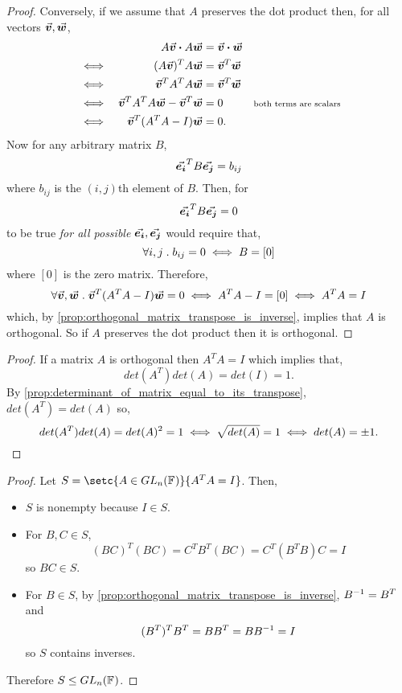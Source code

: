 \documentclass[../MathsNotesBase.tex]{subfiles}
\begin{document}
{\begin{proof}
			Conversely, if we assume that $A$ preserves the dot product then, for all vectors ${ \vec{\bm{v}},\vec{\bm{w}} }$,
			\begin{align*}
			&& A\vec{\bm{v}} \boldsymbol{\cdot} A\vec{\bm{w}} &= \vec{\bm{v}} \boldsymbol{\cdot} \vec{\bm{w}}  \\
			&\iff & (A\vec{\bm{v}})^TA\vec{\bm{w}} &= \vec{\bm{v}}^T\vec{\bm{w}} & \\
			&\iff & \vec{\bm{v}}^TA^TA\vec{\bm{w}} &= \vec{\bm{v}}^T\vec{\bm{w}} & \\
			&\iff & \vec{\bm{v}}^TA^TA\vec{\bm{w}} - \vec{\bm{v}}^T\vec{\bm{w}} &= 0 & \text{\scriptsize{both terms are scalars}}\\
			&\iff & \vec{\bm{v}}^T(A^TA - I)\vec{\bm{w}} &= 0. &
			\end{align*}
			Now for any arbitrary matrix $B$, 
			\[ \vec{\bm{e_i}}^T B \vec{\bm{e_j}} = b_{ij} \]
			where $b_{ij}$ is the $(i,j)$th element of $B$. Then, for
			\[ \vec{\bm{e_i}}^T B \vec{\bm{e_j}} = 0 \]
			to be true \textit{for all possible} ${ \vec{\bm{e_i}},\vec{\bm{e_j}} }$ would require that, 
			\[ \forall i,j \;.\; b_{ij} = 0 \iff B = [0] \]
			where $[0]$ is the zero matrix. Therefore,
			\[ \forall \vec{\bm{v}},\vec{\bm{w}} \;.\; \vec{\bm{v}}^T(A^TA - I)\vec{\bm{w}} = 0 \iff A^TA - I = [0] \iff A^TA = I \]
			which, by \autoref{prop:orthogonal_matrix_transpose_is_inverse}, implies that $A$ is orthogonal. So if $A$ preserves the dot product then it is orthogonal.
		\end{proof}
	
	
		\bigskip
		\begin{proof}
			If a matrix $A$ is orthogonal then ${ A^TA = I }$ which implies that,
			\[ det(A^T)det(A) = det(I) = 1. \]
			By \autoref{prop:determinant_of_matrix_equal_to_its_transpose}, ${ det(A^T) = det(A) }$ so,
			\[ det(A^T)det(A) = det(A)^2 = 1 \iff \sqrt{det(A)} = 1 \iff det(A) = \pm 1.  \qedhere \]
		\end{proof}
	
		
		\bigskip
		\begin{proof}
			Let ${ S = \setc{ A \in GL_n(\F{}) }{ A^TA = I } }$. Then,
			\begin{itemize}
				\item{$S$ is nonempty because ${ I \in S }$.}
				\item{For ${ B,C \in S }$,
					\[ (BC)^T(BC) = C^TB^T(BC) = C^T(B^TB)C = I \]
					so ${ BC \in S }$.
				}
				\item{For ${ B \in S }$, by \autoref{prop:orthogonal_matrix_transpose_is_inverse}, ${ {B}^{-1} = B^T }$ and
					\[ (B^T)^TB^T = BB^T = B{B}^{-1} = I \]
					so $S$ contains inverses.
				}
			\end{itemize}
			Therefore ${ S \leq GL_n(\mathbb{F}^{}) }$.	
		\end{proof}
		
}
\end{document}
